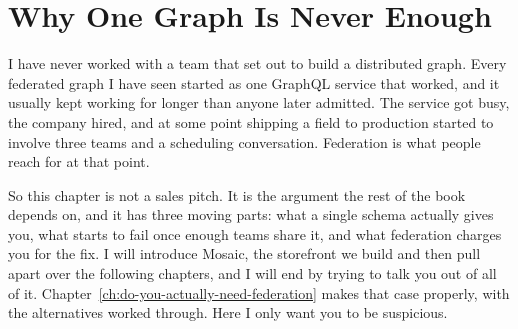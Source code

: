 \chapter{Why One Graph Is Never Enough}
\label{ch:why-one-graph-is-never-enough}

I have never worked with a team that set out to build a distributed graph.
Every federated graph I have seen started as one GraphQL service that worked,
and it usually kept working for longer than anyone later admitted. The service
got busy, the company hired, and at some point shipping a field to production
started to involve three teams and a scheduling conversation. Federation is
what people reach for at that point.

So this chapter is not a sales pitch. It is the argument the rest of the book
depends on, and it has three moving parts: what a single schema actually gives
you, what starts to fail once enough teams share it, and what federation
charges you for the fix. I will introduce Mosaic, the storefront we build and
then pull apart over the following chapters, and I will end by trying to talk
you out of all of it. Chapter~\ref{ch:do-you-actually-need-federation} makes
that case properly, with the alternatives worked through. Here I only want you
to be suspicious.








